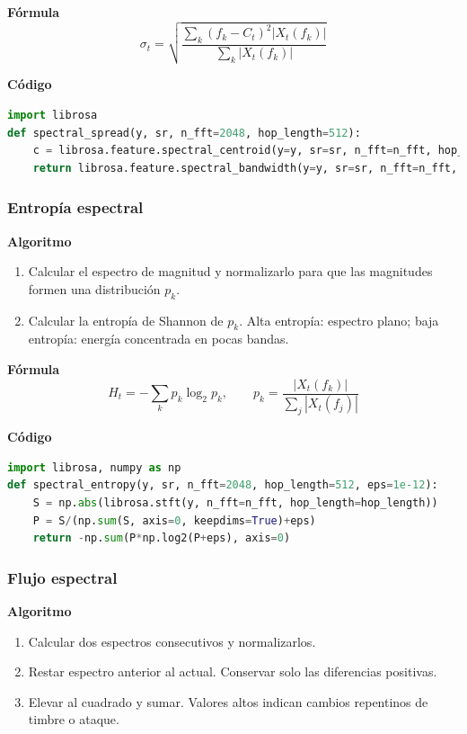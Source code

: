 \textbf{Fórmula}
\[
\sigma_t=\sqrt{\frac{\sum_k (f_k-C_t)^2|X_t(f_k)|}{\sum_k|X_t(f_k)|}}
\]

\textbf{Código}
\begin{lstlisting}[language=Python, label={lst:spread_code}, caption={Dispersión espectral}]
import librosa
def spectral_spread(y, sr, n_fft=2048, hop_length=512):
    c = librosa.feature.spectral_centroid(y=y, sr=sr, n_fft=n_fft, hop_length=hop_length)
    return librosa.feature.spectral_bandwidth(y=y, sr=sr, n_fft=n_fft, hop_length=hop_length, centroid=c, p=2)[0]
\end{lstlisting}

\subsubsection{Entropía espectral}
\textbf{Algoritmo} \parencite{peeters2004large, muller2015fmp}
\begin{enumerate}
    \item Calcular el espectro de magnitud y normalizarlo para que las magnitudes formen una distribución \(p_k\).
    \item Calcular la entropía de Shannon de \(p_k\). Alta entropía: espectro plano; baja entropía: energía concentrada en pocas bandas.
\end{enumerate}

\textbf{Fórmula}
\[
H_t=-\sum_{k} p_k\log_2 p_k,\qquad p_k=\frac{|X_t(f_k)|}{\sum_{j}|X_t(f_j)|}
\]

\textbf{Código}
\begin{lstlisting}[language=Python, label={lst:spec_entropy}, caption={Entropía espectral}]
import librosa, numpy as np
def spectral_entropy(y, sr, n_fft=2048, hop_length=512, eps=1e-12):
    S = np.abs(librosa.stft(y, n_fft=n_fft, hop_length=hop_length))
    P = S/(np.sum(S, axis=0, keepdims=True)+eps)
    return -np.sum(P*np.log2(P+eps), axis=0)
\end{lstlisting}

\subsubsection{Flujo espectral}
\textbf{Algoritmo} \parencite{muller2015fmp}
\begin{enumerate}
    \item Calcular dos espectros consecutivos y normalizarlos.
    \item Restar espectro anterior al actual. Conservar solo las diferencias positivas.
    \item Elevar al cuadrado y sumar. Valores altos indican cambios repentinos de timbre o ataque.
\end{enumerate}

